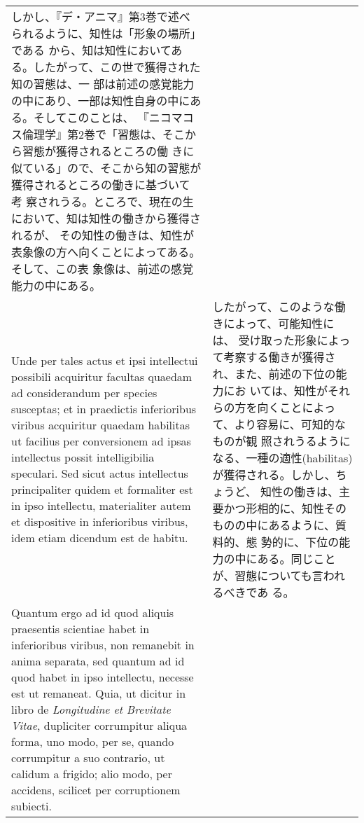 \documentclass[10pt]{jsarticle} %
\begin{document}
\begin{longtable}{p{21em}p{21em}}
しかし、『デ・アニマ』第3巻で述べられるように、知性は「形象の場所」である
 から、知は知性においてある。したがって、この世で獲得された知の習態は、一
 部は前述の感覚能力の中にあり、一部は知性自身の中にある。そしてこのことは、
 『ニコマコス倫理学』第2巻で「習態は、そこから習態が獲得されるところの働
 きに似ている」ので、そこから知の習態が獲得されるところの働きに基づいて考
 察されうる。ところで、現在の生において、知は知性の働きから獲得されるが、
 その知性の働きは、知性が表象像の方へ向くことによってある。そして、この表
 象像は、前述の感覚能力の中にある。

\\


 Unde per tales actus et ipsi intellectui possibili acquiritur facultas
quaedam ad considerandum per species susceptas; et in praedictis
inferioribus viribus acquiritur quaedam
habilitas
 ut facilius per conversionem ad ipsas intellectus
possit intelligibilia speculari. Sed sicut actus intellectus
principaliter quidem et formaliter est in ipso intellectu, materialiter
autem et dispositive in inferioribus viribus, idem etiam dicendum est de
habitu.

& したがって、このような働きによって、可能知性には、
受け取った形象によって考察する働きが獲得され、また、前述の下位の能力にお
いては、知性がそれらの方を向くことによって、より容易に、可知的なものが観
照されうるようになる、一種の適性(habilitas)が獲得される。しかし、ちょうど、
知性の働きは、主要かつ形相的に、知性そのものの中にあるように、質料的、態
勢的に、下位の能力の中にある。同じことが、習態についても言われるべきであ
る。



\\


Quantum ergo ad
id quod aliquis praesentis scientiae habet in inferioribus viribus, non
remanebit in anima separata, sed quantum ad id quod habet in ipso
intellectu, necesse est ut remaneat. Quia, ut dicitur in libro de
{\it Longitudine et Brevitate Vitae}, dupliciter corrumpitur aliqua forma, uno
modo, per se, quando corrumpitur a suo contrario, ut calidum a frigido;
alio modo, per accidens, scilicet per corruptionem subiecti. 
&


\end{longtable}
\end{document}
